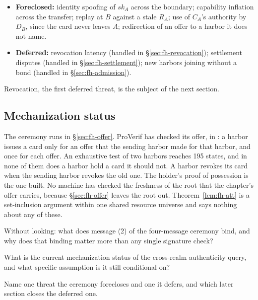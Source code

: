 \documentclass[11pt,a4paper]{article}
\theoremstyle{definition}
\theoremstyle{remark}
\begin{document}
\begin{itemize}[nosep]
\item \textbf{Foreclosed:} identity spoofing of $\mathit{sk}_A$ across the boundary; capability inflation across the transfer; replay at $B$ against a stale $R_A$; use of $C_A$'s authority by $D_B$, since the card never leaves $A$; redirection of an offer to a harbor it does not name.
\item \textbf{Deferred:} revocation latency (handled in \S\ref{sec:fh-revocation}); settlement disputes (handled in \S\ref{sec:fh-settlement}); new harbors joining without a bond (handled in \S\ref{sec:fh-admission}).
\end{itemize}

%
Revocation, the first deferred threat, is the subject of the next section.

\subsection{Mechanization status}\label{sec:fh-xfer-mech}

The ceremony runs in \S\ref{sec:fh-offer}. ProVerif has checked its offer, in : a harbor issues a card only for an offer that the sending harbor made for that harbor, and once for each offer. An exhaustive test of two harbors reaches 195 states, and in none of them does a harbor hold a card it should not. A harbor revokes its card when the sending harbor revokes the old one. The holder's proof of possession is the one  built. No machine has checked the freshness of the root that the chapter's offer carries, because \S\ref{sec:fh-offer} leaves the root out. Theorem~\ref{lem:fh-att} is a set-inclusion argument within one shared resource universe and says nothing about any of these.

\begin{pdrecitationbody}
\item Without looking: what does message (2) of the four-message ceremony bind, and why does that binding matter more than any single signature check?
\item What is the current mechanization status of the cross-realm authenticity query, and what specific assumption is it still conditional on?
\item Name one threat the ceremony forecloses and one it defers, and which later section closes the deferred one.
\end{pdrecitationbody}
\end{document}
